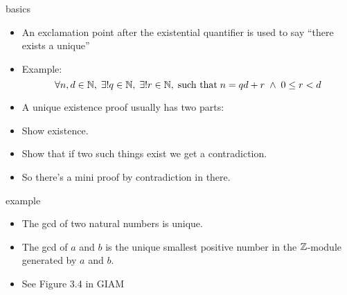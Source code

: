 \documentclass[landscape]{beamer}
\begin{document}
\begin{frame}{basics}
\begin{itemize}
\item An exclamation point after the existential quantifier is used to say ``there exists a unique\textellipsis'' \pause
\item Example: \pause \newline
\[ \forall n, d \in {\mathbb N}, \; \exists ! q \in {\mathbb N}, \; \exists ! r \in {\mathbb N}, \; \mbox{such that} \; n=qd+r \; \land \; 0 \leq r < d \] 
\pause
\item A unique existence proof usually has two parts: \pause
\item Show existence. \pause
\item Show that if two such things exist we get a contradiction. \pause
\item So there's a mini proof by contradiction in there.
\end{itemize}
\end{frame}

\begin{frame}{example}
\begin{itemize}
\item The gcd of two natural numbers is unique. \pause
\item The gcd of $a$ and $b$ is the unique smallest positive number in the ${\mathbb Z}$-module generated by $a$ and $b$. \pause
\item See Figure 3.4 in GIAM
\end{itemize}
\end{frame}
\end{document}
